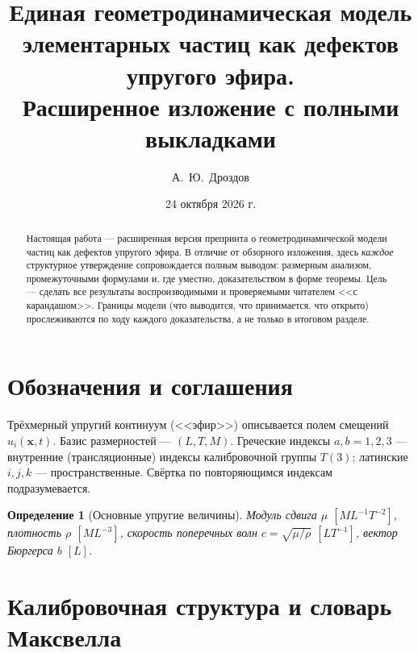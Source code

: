 \documentclass[12pt,a4paper]{article}
\title{\textbf{Единая геометродинамическая модель элементарных частиц
как дефектов упругого эфира.\\
Расширенное изложение с полными выкладками}}
\author{А.~Ю.~Дроздов}
\date{24 октября 2026 г.}
\newtheorem{definition}{Определение}
\begin{document}
\maketitle

\begin{abstract}
\noindent
Настоящая работа --- расширенная версия препринта о геометродинамической модели
частиц как дефектов упругого эфира. В отличие от обзорного изложения, здесь
\emph{каждое} структурное утверждение сопровождается полным выводом: размерным
анализом, промежуточными формулами и, где уместно, доказательством в форме теоремы.
Цель --- сделать все результаты воспроизводимыми и проверяемыми читателем
<<с карандашом>>. Границы модели (что выводится, что принимается, что открыто)
прослеживаются по ходу каждого доказательства, а не только в итоговом разделе.
\end{abstract}

\tableofcontents
\newpage

\section{Обозначения и соглашения}
Трёхмерный упругий континуум (<<эфир>>) описывается полем смещений $u_i(\mathbf{x},t)$.
Базис размерностей --- $(L,T,M)$. Греческие индексы $a,b=1,2,3$ --- внутренние
(трансляционные) индексы калибровочной группы $T(3)$; латинские $i,j,k$ ---
пространственные. Свёртка по повторяющимся индексам подразумевается.

\begin{definition}[Основные упругие величины]
Модуль сдвига $\mu$ $[ML^{-1}T^{-2}]$, плотность $\rho$ $[ML^{-3}]$, скорость
поперечных волн $c=\sqrt{\mu/\rho}$ $[LT^{-1}]$, вектор Бюргерса $b$ $[L]$.
\end{definition}

\section{Калибровочная структура и словарь Максвелла}
\end{document}
